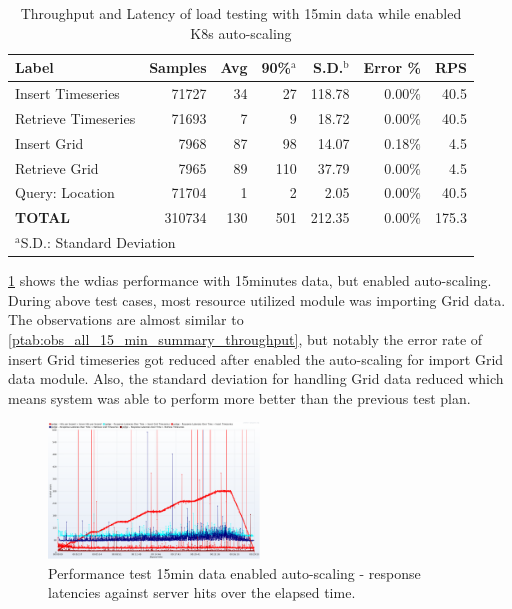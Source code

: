 \documentclass[conference]{IEEEtran}
\begin{document}
\begin{table}[htbp]
\caption{Throughput and Latency of load testing with 15min data while enabled K8s auto-scaling}
\begin{center}
\begin{adjustbox}{width=0.45\textwidth}
\footnotesize
\begin{tabular}{|l|r|r|r|r|r|r|}
\hline
\textbf{Label} & \textbf{Samples} & \textbf{Avg} & \textbf{90\%$^{\mathrm{a}}$} & \textbf{S.D.$^{\mathrm{b}}$} & \textbf{Error \%} & \textbf{RPS} \\ \hline
Insert Timeseries & 71727 & 34 & 27 & 118.78 & 0.00\% & 40.5 \\ \hline
Retrieve Timeseries & 71693 & 7 & 9 & 18.72 & 0.00\% & 40.5 \\ \hline
Insert Grid & 7968 & 87 & 98 & 14.07 & 0.18\% & 4.5 \\ \hline
Retrieve Grid & 7965 & 89 & 110 & 37.79 & 0.00\% & 4.5 \\ \hline
Query: Location & 71704 & 1 & 2 & 2.05 & 0.00\% & 40.5 \\ \hline
\textbf{TOTAL} & 310734 & 130 & 501 & 212.35 & 0.00\% & 175.3 \\ \hline
\multicolumn{4}{l}{$^{\mathrm{a}}$S.D.: Standard Deviation}{$^{\mathrm{b}}$90\%: 90\% percentile}
\end{tabular}
\end{adjustbox}
\label{ptab:obs_all_auto_15_min_summary_throughput}
\end{center}
\end{table}

\cref{ptab:obs_all_auto_15_min_summary_throughput} shows the \acrshort{wdias} performance with 15minutes data, but enabled auto-scaling. During above test cases, most resource utilized module was importing Grid data.
The observations are almost similar to \cref{ptab:obs_all_15_min_summary_throughput}, but notably the error rate of insert Grid timeseries got reduced after enabled the auto-scaling for import Grid data module. Also, the standard deviation for handling Grid data reduced which means system was able to perform more better than the previous test plan.

\begin{figure}[htbp]
\centerline{\includegraphics[width=0.5\textwidth]{results/obs/all_auto/obs_all_auto_15m_res_latencies_against_hits.png}}
\caption{Performance test 15min data enabled auto-scaling - response latencies against server hits over the elapsed time.}
\label{pfi:test_obs_auto_all_15_min_latency_vs_hits}
\end{figure}
\end{document}
